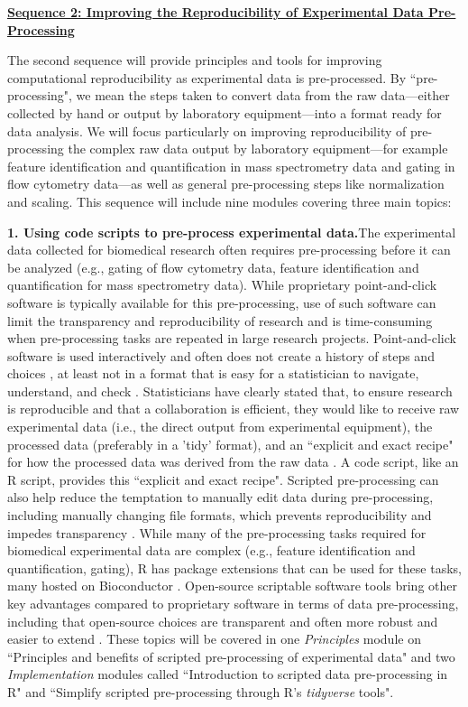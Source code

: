 \documentclass[pdftex,english,11pt,parskip=half]{scrartcl}
\begin{document}
\underline{\textbf{Sequence 2: Improving the Reproducibility of Experimental Data
Pre-Processing}}

The second sequence will provide principles and tools for improving
computational reproducibility as
experimental data is pre-processed. By ``pre-processing", we mean the steps 
taken to convert data from the raw data---either collected by hand or output
by laboratory equipment---into a format ready for data analysis. We will focus
particularly on improving reproducibility of pre-processing the complex 
raw data output by laboratory equipment---for example feature identification 
and quantification in mass spectrometry data and gating in flow cytometry data---as well
as general pre-processing steps like normalization and scaling. This sequence will include nine modules covering three main topics: 

\textbf{1. Using code scripts to pre-process experimental data.}The experimental data collected for biomedical research often requires 
pre-processing before it can be analyzed (e.g., gating of flow cytometry data, 
feature identification 
and quantification for mass spectrometry data). While 
proprietary point-and-click software is typically available for this pre-processing,
use of such software can limit the transparency and reproducibility of research and is 
time-consuming when pre-processing tasks are repeated in large research projects. Point-and-click software is used interactively and often does not create a history of steps and choices \cite{pernet2015improving}, at least not in a format that is easy for a statistician to navigate, understand, and check \cite{peng2011reproducible, pernet2015improving}. 
Statisticians have clearly stated that, to ensure research is reproducible and that a collaboration is efficient, they would like to receive raw experimental data (i.e., the direct output from experimental equipment), the processed data (preferably in a 'tidy' format), and an ``explicit and exact recipe" for how the processed data was derived from the raw data \cite{ellis2018share}.
A code script, like an R script, provides this ``explicit and exact recipe". Scripted pre-processing can also help reduce the temptation to manually edit data during pre-processing, including manually changing file formats, which prevents reproducibility and impedes transparency \cite{pernet2015improving}. While many of the pre-processing tasks required for biomedical experimental data are complex (e.g., feature identification and quantification, gating), R has package extensions that can be used for these tasks, many hosted on Bioconductor \cite{huber2015orchestrating}. 
Open-source scriptable
software tools bring other key advantages compared to proprietary software in terms of data
pre-processing, including that open-source choices are transparent and often more robust and easier to extend \cite{cetinkaya2017infrastructure, huber2015orchestrating,
brown2014reproducible, piccolo2016tools, baumer2018lessons}. 
These topics will be covered in one
\textit{Principles} module on ``Principles and benefits of scripted
pre-processing of experimental data" and two \textit{Implementation} modules
called ``Introduction to scripted data pre-processing in R" and ``Simplify
scripted pre-processing through R's \textit{tidyverse} tools".
\end{document}
